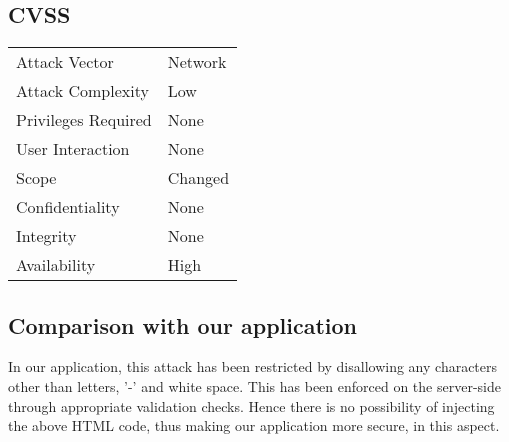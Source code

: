 \subsection{CVSS}
\begin{tabular}{l | l}
Attack Vector		& Network \\
Attack Complexity	& Low \\
Privileges Required & None \\
User Interaction	& None \\
Scope				& Changed \\
Confidentiality		& None \\
Integrity			& None \\
Availability		& High
\end{tabular}

\subsection{Comparison with our application}
In our application, this attack has been restricted by disallowing any characters other than letters, '-' and white space. This has been enforced on the server-side through appropriate validation checks. Hence there is no possibility of injecting the above HTML code, thus making our application more secure, in this aspect.
\clearpage